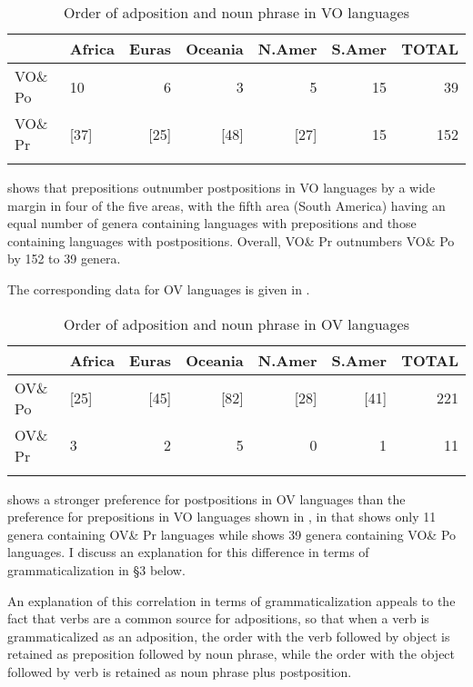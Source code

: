 \documentclass[output=paper]{langsci/langscibook}
\begin{document}
\begin{table}
\begin{tabularx}{\textwidth}{Xlrrrrr} 
\lsptoprule
& \bfseries Africa & \bfseries Euras & \bfseries Oceania & \bfseries N.Amer & \bfseries S.Amer & \bfseries TOTAL\\
\midrule
VO\& Po & 10 & 6 & 3 & 5 & 15 & 39\\
VO\& Pr & [37] & [25] & [48] & [27] & 15 & 152\\
\lspbottomrule
\end{tabularx}
\caption{\label{tab:dryer:1}Order of adposition and noun phrase in VO languages}
\end{table}



 shows that prepositions outnumber postpositions in VO languages by a wide margin in four of the five areas, with the fifth area (South America) having an equal number of genera containing languages with prepositions and those containing languages with postpositions. Overall, VO\& Pr outnumbers VO\& Po by 152 to 39 genera.

The corresponding data for OV languages is given in .

\begin{table}
\begin{tabularx}{\textwidth}{Xlrrrrr} 
\lsptoprule
& \bfseries Africa & \bfseries Euras & \bfseries Oceania & \bfseries N.Amer & \bfseries S.Amer & \bfseries TOTAL\\
\midrule
OV\& Po & [25] & [45] & [82] & [28] & [41] & 221\\
OV\& Pr & 3 & 2 & 5 & 0 & 1 & 11\\
\lspbottomrule
\end{tabularx}
\caption{\label{tab:dryer:2}Order of adposition and noun phrase in OV languages}
\end{table}


 shows a stronger preference for postpositions in OV languages than the preference for prepositions in VO languages shown in , in that  shows only 11 genera containing OV\& Pr languages while  shows 39 genera containing VO\& Po languages. I discuss an explanation for this difference in terms of grammaticalization in §3 below.

An explanation of this correlation in terms of grammaticalization appeals to the fact that verbs are a common source for adpositions, so that when a verb is grammaticalized as an adposition, the order with the verb followed by object is retained as preposition followed by noun phrase, while the order with the object followed by verb is retained as noun phrase plus postposition.
\end{document}
